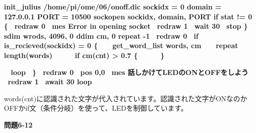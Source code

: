 \documentclass[a4paper,dvipdfmx]{jarticle}
\begin{document}
\begin{minipage}{17.006cm}
{\ttfamily\bfseries
init\_julius {\textquotedbl}/home/pi/ome/06/onoff.dic{\textquotedbl}\newline
\newline
sockidx = 0\newline
domain = {\textquotedbl}127.0.0.1{\textquotedbl}\newline
PORT = 10500\newline
\newline
sockopen sockidx, domain, PORT\newline
\newline
if stat != 0 \{\newline
 \ redraw 0\newline
 \ mes {\textquotedbl}Error in opening socket{\textquotedbl}\newline
 \ redraw 1\newline
 \ wait 30\newline
 \ stop\newline
\}\newline
\newline
sdim wrods, 4096, 0\newline
ddim cm, 0\newline
repeat -1\newline
 \ redraw 0\newline
 \ if is\_recieved(sockidx) = 0 \{\newline
 \ \ \ get\_word\_list words, cm\newline
 \ \ \ repeat length(words)\newline
 \ \ \ \ \ if cm(cnt) {\textgreater} 0.7 \{\newline
 \ \ \ \ \ \} \ \ }

{\ttfamily\bfseries
　loop\newline
 \ \}\newline
 \ redraw 0\newline
 \ pos 0,0\newline
 \ mes
{\textquotedbl}話しかけてLEDのONとOFFをしよう{\textquotedbl}\newline
 \ redraw 1\newline
 \ await 30\newline
loop\newline
}
\end{minipage}
{
words(cnt)に認識された文字が代入されています。認識された文字がONなのかOFFかif文（条件分岐）を使って、LEDを制御しています。}

{\bfseries
問題6-12}
\end{document}
